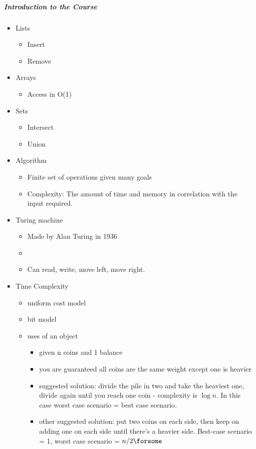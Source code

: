 \documentclass[9pt, letterpaper, oneside]{article}
\begin{document}
\subparagraph{Introduction to the Course}
\newline
\begin{itemize}
	\item Lists
		\begin{itemize}
			\item Insert
			\item Remove
		\end{itemize}
	\item Arrays
		\begin{itemize}
			\item Access in O(1)
		\end{itemize}
	\item Sets
		\begin{itemize}
			\item Intersect
			\item Union
		\end{itemize}
	\item Algorithm
		\begin{itemize}
			\item Finite set of operations given many goals
			\item Complexity: The amount of time and memory in correlation with the input required.
		\end{itemize}
	\item Turing machine
		\begin{itemize}
			\item Made by Alan Turing in 1936
			\item
			\item Can read, write, move left, move right.
		\end{itemize}
	\item Time Complexity
		\begin{itemize}
			\item uniform cost model
			\item bit model
			\item uses of an object
				\begin{itemize}
					\item given n coins and 1 balance
					\item you are guaranteed all coins are the same weight except one is heavier
					\item suggested solution: divide the pile in two and take the heaviest one, divide again until you reach one coin - complexity is $\log n$. In this case worst case scenario = best case scenario.
					\item other suggested solution: put two coins on each side, then keep on adding one on each side until there's a heavier side. Best-case scenario = 1, worst case scenario = $n / 2 \forsome $
				\end{itemize}
		\end{itemize}
\end{itemize}
\end{document}
